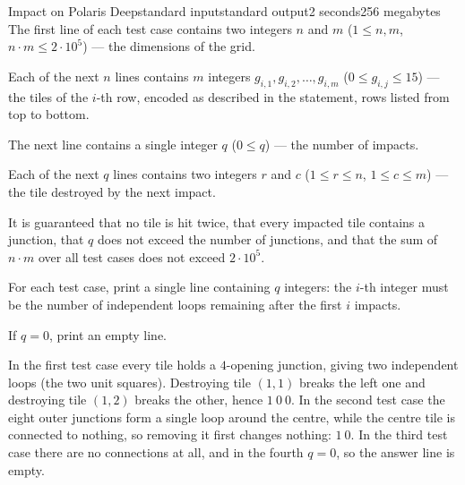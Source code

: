 \begin{problem}{Impact on Polaris Deep}{standard input}{standard output}{2 seconds}{256 megabytes}
The first line of each test case contains two integers $n$ and $m$ ($1 \le n, m$, $n \cdot m \le 2 \cdot 10^5$) --- the dimensions of the grid.

Each of the next $n$ lines contains $m$ integers $g_{i,1}, g_{i,2}, \ldots, g_{i,m}$ ($0 \le g_{i,j} \le 15$) --- the tiles of the $i$-th row, encoded as described in the statement, rows listed from top to bottom.

The next line contains a single integer $q$ ($0 \le q$) --- the number of impacts.

Each of the next $q$ lines contains two integers $r$ and $c$ ($1 \le r \le n$, $1 \le c \le m$) --- the tile destroyed by the next impact.

It is guaranteed that no tile is hit twice, that every impacted tile contains a junction, that $q$ does not exceed the number of junctions, and that the sum of $n \cdot m$ over all test cases does not exceed $2 \cdot 10^5$.


\OutputFile
For each test case, print a single line containing $q$ integers: the $i$-th integer must be the number of independent loops remaining after the first $i$ impacts.

If $q = 0$, print an empty line.


\Example

\begin{example}
%
\end{example}

\Note
In the first test case every tile holds a $4$-opening junction, giving two independent loops (the two unit squares). Destroying tile $(1,1)$ breaks the left one and destroying tile $(1,2)$ breaks the other, hence $1\ 0\ 0$. In the second test case the eight outer junctions form a single loop around the centre, while the centre tile is connected to nothing, so removing it first changes nothing: $1\ 0$. In the third test case there are no connections at all, and in the fourth $q = 0$, so the answer line is empty.


\end{problem}

